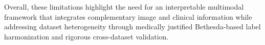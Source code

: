 \documentclass{article}
\begin{document}
Overall, these limitations highlight the need for an interpretable multimodal framework that integrates complementary image and clinical information while addressing dataset heterogeneity through medically justified Bethesda-based label harmonization and rigorous cross-dataset validation.





\end{document}
